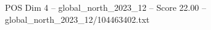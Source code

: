 \begin{textsample}{POS Dim 4 – global\_north\_2023\_12 – Score 22.00 – global\_north\_2023\_12/104463402.txt}
\end{textsample}
